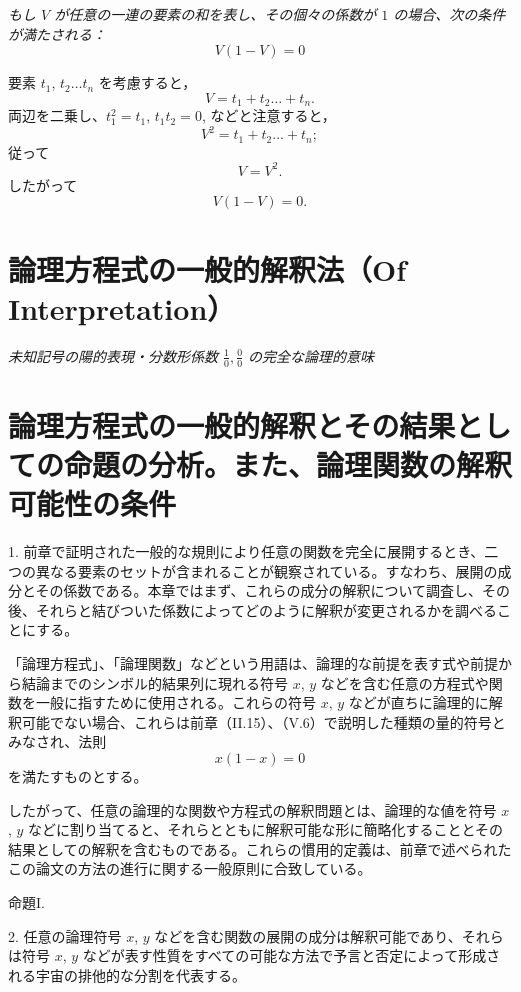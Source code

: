 \documentclass[a4paper,11pt,openany]{ltjsbook}
\begin{document}
\textit{もし $V$ が任意の一連の要素の和を表し、その個々の係数が $1$ の場合、次の条件が満たされる：
\[
V(1 - V) = 0
\]}

要素 $t_1$, $t_2 \dots t_n$ を考慮すると，
\[
V = t_1 + t_2 \dots + t_n.
\]
両辺を二乗し、$t_1^2 = t_1$, $t_1 t_2 = 0$, などと注意すると，
\[
V^2 = t_1 + t_2 \dots + t_n;
\]
従って
\[
V = V^2.
\]
したがって
\[
V(1 - V) = 0.
\]

\newpage

\chapter{論理方程式の一般的解釈法（Of Interpretation）}
\label{ch:vi}

\begin{center}
\large\textit{未知記号の陽的表現・分数形係数 $\frac{1}{0}, \frac{0}{0}$ の完全な論理的意味}
\end{center}
\vspace{4mm}

\chapter{論理方程式の一般的解釈とその結果としての命題の分析。また、論理関数の解釈可能性の条件}

1. 前章で証明された一般的な規則により任意の関数を完全に展開するとき、二つの異なる要素のセットが含まれることが観察されている。すなわち、展開の成分とその係数である。本章ではまず、これらの成分の解釈について調査し、その後、それらと結びついた係数によってどのように解釈が変更されるかを調べることにする。

「論理方程式」、「論理関数」などという用語は、論理的な前提を表す式や前提から結論までのシンボル的結果列に現れる符号 $x$, $y$ などを含む任意の方程式や関数を一般に指すために使用される。これらの符号 $x$, $y$ などが直ちに論理的に解釈可能でない場合、これらは前章（II.15）、（V.6）で説明した種類の量的符号とみなされ、法則
\[
x(1-x) = 0
\]
を満たすものとする。

したがって、任意の論理的な関数や方程式の解釈問題とは、論理的な値を符号 $x$, $y$ などに割り当てると、それらとともに解釈可能な形に簡略化することとその結果としての解釈を含むものである。これらの慣用的定義は、前章で述べられたこの論文の方法の進行に関する一般原則に合致している。

\begin{center}
\textsc{命題I.}
\end{center}

2. 任意の論理符号 $x$, $y$ などを含む関数の展開の成分は解釈可能であり、それらは符号 $x$, $y$ などが表す性質をすべての可能な方法で予言と否定によって形成される宇宙の排他的な分割を代表する。
\end{document}
